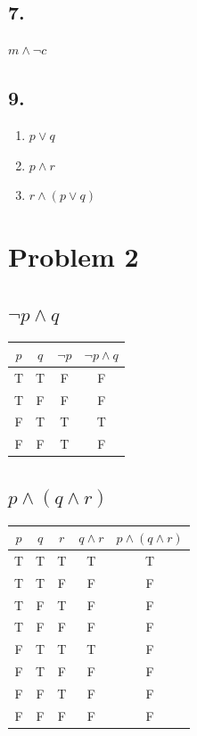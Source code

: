 \documentclass[a4paper, 10pt]{article}
\begin{document}
        \subsection*{7.}
            \( m \land \neg c \)

        \subsection*{9.}
            \begin{enumerate}[label=\alph*.]
                \item \( p \lor q \)
                \item \( p \land r \)
                \item \( r \land (p \lor q )\)
            \end{enumerate}

    \pagebreak
    \section{Problem 2}
        \subsection{\( \neg p \land q \)}
            \begin{tabular}{|c|c|c|c|}
                \hline
                $p$ & $q$ & $\neg p$ & $\neg p \land q$ \\ \hline
                T   &  T  &  F  &  F  \\ \hline
                T   &  F  &  F  &  F  \\ \hline
                F   &  T  &  T  &  T  \\ \hline
                F   &  F  &  T  &  F  \\ \hline
            \end{tabular}
        \subsection{\( p \land (q \land r) \)}
            \begin{tabular}{|c|c|c|c|c|}
                \hline
                $p$ & $q$ & $r$ & $q \land r$ & $p \land (q \land r)$ \\ \hline
                T & T & T & T & T \\ \hline
                T & T & F & F & F \\ \hline
                T & F & T & F & F \\ \hline
                T & F & F & F & F \\ \hline
                F & T & T & T & F \\ \hline
                F & T & F & F & F \\ \hline
                F & F & T & F & F \\ \hline
                F & F & F & F & F \\ \hline
            \end{tabular}
\end{document}
